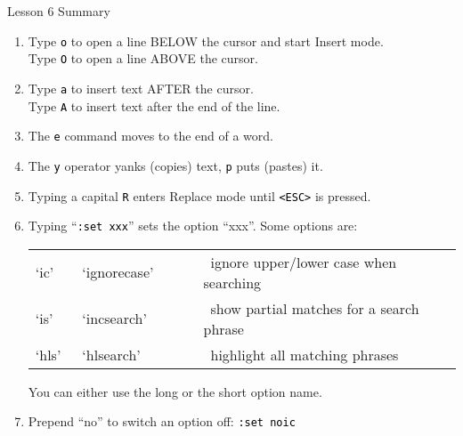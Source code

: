 \documentclass[handout, 10pt]{beamer}
\newcommand{\code}[2][black]{\textcolor{#1}{\colorbox{codegray}{\texttt{#2}}}}
\begin{document}
\begin{frame}{Lesson 6 Summary}
	\begin{enumerate}
		\item Type \code{o} to open a line BELOW the cursor and start Insert
			mode. \\
			Type \code{O} to open a line ABOVE the cursor.

		\item Type  \code{a}  to insert text AFTER the cursor. \\
			Type \code{A} to insert text after the end of the line.

		\item The \code{e} command moves to the end of a word.

		\item The \code{y} operator yanks (copies) text, \code{p} puts (pastes)
			it.

		\item Typing a capital \code{R} enters Replace mode until \code{<ESC>}
			is pressed.

		\item Typing ``\code{:set xxx}'' sets the option ``xxx''. Some options
			are:
			\begin{table}[H]
				\centering
				\begin{tabular}{llcl}
					`ic' & ~`ignorecase' & ~~~ &~ignore upper/lower case when
					searching \\
					`is' & ~`incsearch' & ~~~ &~show partial matches for a
					search phrase \\
					`hls' & ~`hlsearch' & ~~~ &~highlight all matching phrases
				\end{tabular}
			\end{table}
			You can either use the long or the short option name.

		\item Prepend ``no'' to switch an option off: \code{:set noic}
	\end{enumerate}

\end{frame}
\end{document}
